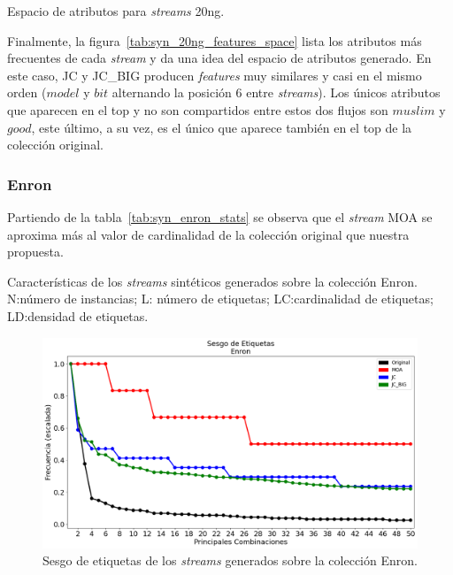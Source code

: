 \begin{table}[htbp]
	\centering
	\begin{adjustbox}{max width=\textwidth}
		
	\end{adjustbox}
	\caption{Espacio de atributos para \textit{streams} 20ng.}
	\label{tab:syn_20ng_features_space}
\end{table}

Finalmente, la figura~\ref{tab:syn_20ng_features_space} lista los atributos más
frecuentes de cada \textit{stream} y da una idea del espacio de atributos
generado. En este caso, JC y JC\_BIG producen \textit{features} muy similares y
casi en el mismo orden ($model$ y $bit$ alternando la posición 6 entre
\textit{streams}). Los únicos atributos que aparecen en el top y no son
compartidos entre estos dos flujos son $muslim$ y $good$, este último, a su vez,
es el único que aparece también en el top de la colección original.

\subsubsection{Enron}

Partiendo de la tabla~\ref{tab:syn_enron_stats} se observa que el
\textit{stream} MOA se aproxima más al valor de cardinalidad de la colección
original que nuestra propuesta.

\bigskip
\begin{table}[htbp]
	\centering
	\begin{adjustbox}{max width=\textwidth}
		
	\end{adjustbox}
	\caption[Características de los \textit{streams} sintéticos generados sobre
		la colección Enron.]{Características de los \textit{streams} sintéticos
		generados sobre la colección Enron.  N:\@ número de instancias; L:\@
		número de etiquetas; LC:\@ cardinalidad de etiquetas; LD:\@ densidad de
		etiquetas.}
	\label{tab:syn_enron_stats}
\end{table}

\bigskip
\begin{figure}[htbp]
	\includegraphics[width=\linewidth]{figures/experiments/syn/enron/label_skew.png}
	\caption{Sesgo de etiquetas de los \textit{streams} generados sobre la colección
		Enron.}
	\label{fig:syn_enron_label_skew}
\end{figure}

